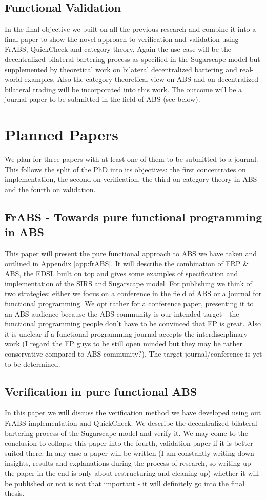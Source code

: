 \subsection{Functional Validation}
In the final objective we built on all the previous research and combine it into a final paper to show the novel approach to verification and validation using FrABS, QuickCheck and category-theory. Again the use-case will be the decentralized bilateral bartering process as specified in the Sugarscape model but supplemented by theoretical work on bilateral decentralized bartering and real-world examples. Also the category-theoretical view on ABS and on decentralized bilateral trading will be incorporated into this work. The outcome will be a journal-paper to be submitted in the field of ABS (see below).

\section{Planned Papers}
We plan for three papers with at least one of them to be submitted to a journal. This follows the split of the PhD into its objectives: the first concentrates on implementation, the second on verification, the third on category-theory in ABS and the fourth on validation. 

\subsection{FrABS - Towards pure functional programming in ABS}
This paper will present the pure functional approach to ABS we have taken and outlined in Appendix \ref{app:frABS}. It will describe the combination of FRP \& ABS, the EDSL built on top and gives some examples of specification and implementation of the SIRS and Sugarscape model.
For publishing we think of two strategies: either we focus on a conference in the field of ABS or a journal for functional programming. We opt rather for a conference paper, presenting it to an ABS audience because the ABS-community is our intended target - the functional programming people don't have to be convinced that FP is great. Also it is unclear if a functional programming journal accepts the interdisciplinary work (I regard the FP guys to be still open minded but they may be rather conservative compared to ABS community?). The target-journal/conference is yet to be determined.

\subsection{Verification in pure functional ABS}
In this paper we will discuss the verification method we have developed using out FrABS implementation and QuickCheck. We describe the decentralized bilateral bartering process of the Sugarscape model and verify it.
We may come to the conclusion to collapse this paper into the fourth, validation paper if it is better suited there. In any case a paper will be written (I am constantly writing down insights, results and explanations during the process of research, so writing up the paper in the end is only about restructuring and cleaning-up) whether it will be published or not is not that important - it will definitely go into the final thesis.

